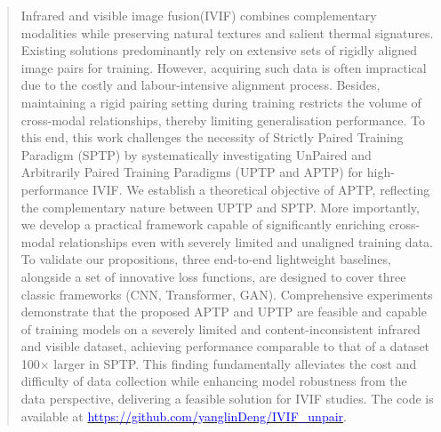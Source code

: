 \begin{abstract}
Infrared and visible image fusion(IVIF) combines complementary modalities while preserving natural textures and salient thermal signatures.
Existing solutions predominantly rely on extensive sets of rigidly aligned image pairs for training. 
However, acquiring such data is often impractical due to the costly and labour-intensive alignment process. 
Besides, maintaining a rigid pairing setting during training restricts the volume of cross-modal relationships, thereby limiting generalisation performance.
To this end, this work challenges the necessity of Strictly Paired Training Paradigm (SPTP) by systematically investigating UnPaired and Arbitrarily Paired Training Paradigms (UPTP and APTP) for high-performance IVIF. 
We establish a theoretical objective of APTP, reflecting the complementary nature between UPTP and SPTP.
More importantly, we develop a practical framework capable of significantly enriching cross-modal relationships even with severely limited and unaligned training data.  
To validate our propositions, three end-to-end lightweight baselines, alongside a set of innovative loss functions, are designed to cover three classic frameworks (CNN, Transformer, GAN).
Comprehensive experiments demonstrate that the proposed APTP and UPTP are feasible and capable of training models on a severely limited and content-inconsistent infrared and visible dataset, achieving performance comparable to that of a dataset 100$\times$ larger in SPTP. 
This finding fundamentally alleviates the cost and difficulty of data collection while enhancing model robustness from the data perspective, delivering a feasible solution for IVIF studies. 
The code is available at \href{https://github.com/yanglinDeng/IVIF_unpair}{\textcolor{blue}{https://github.com/yanglinDeng/IVIF\_unpair}}.


\end{abstract}
